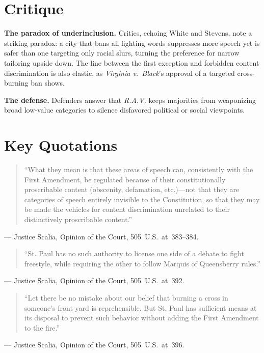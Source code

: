 \documentclass[12pt]{article}
\begin{document}
\section{Critique}

\textbf{The paradox of underinclusion.} Critics, echoing White and Stevens, note a striking paradox: a city that bans all fighting words suppresses more speech yet is safer than one targeting only racial slurs, turning the preference for narrow tailoring upside down. The line between the first exception and forbidden content discrimination is also elastic, as \textit{Virginia v.\ Black}'s approval of a targeted cross-burning ban shows.

\textbf{The defense.} Defenders answer that \textit{R.A.V.} keeps majorities from weaponizing broad low-value categories to silence disfavored political or social viewpoints.

\section{Key Quotations}

\begin{quote}
``What they mean is that these areas of speech can, consistently with the First Amendment, be regulated because of their constitutionally proscribable content (obscenity, defamation, etc.)---not that they are categories of speech entirely invisible to the Constitution, so that they may be made the vehicles for content discrimination unrelated to their distinctively proscribable content.''
\end{quote}
\noindent --- Justice Scalia, Opinion of the Court, 505~U.S.~at~383--384.

\begin{quote}
``St. Paul has no such authority to license one side of a debate to fight freestyle, while requiring the other to follow Marquis of Queensberry rules.''
\end{quote}
\noindent --- Justice Scalia, Opinion of the Court, 505~U.S.~at~392.

\begin{quote}
``Let there be no mistake about our belief that burning a cross in someone's front yard is reprehensible. But St. Paul has sufficient means at its disposal to prevent such behavior without adding the First Amendment to the fire.''
\end{quote}
\noindent --- Justice Scalia, Opinion of the Court, 505~U.S.~at~396.
\end{document}
